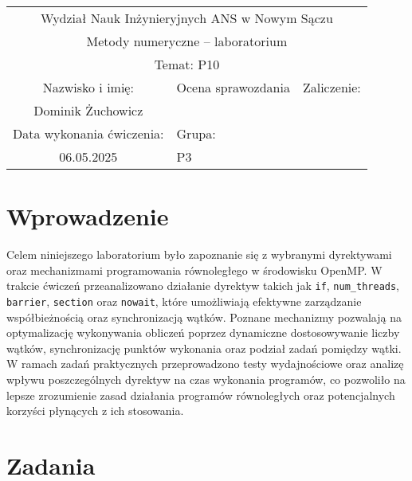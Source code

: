\documentclass{article}
\begin{document}
\sloppy
\begin{center}
    \small
        \renewcommand{\arraystretch}{1.3} %
        \setlength{\tabcolsep}{20pt} %
        \begin{tabular}{|c|c|c|}
            \hline %
            \multicolumn{3}{|c|}{\large Wydział Nauk Inżynieryjnych ANS w Nowym Sączu}   \\
            \multicolumn{3}{|c|}{\large Metody numeryczne – laboratorium}   \\
            \hline %
            \multicolumn{3}{|c|}{\large Temat: P10} \\
            \hline %
            \large Nazwisko i imię: & \large Ocena sprawozdania & \large Zaliczenie:\\
            \cline{2-3}
            \large Dominik Żuchowicz & & \\
            \hline
            \large Data wykonania ćwiczenia:&\multicolumn{2}{l|}{\large Grupa:}\\
            \large  06.05.2025 &\multicolumn{2}{l|}{\large P3}\\
            \hline
        \end{tabular}
    \end{center}

    \section*{Wprowadzenie}
    Celem niniejszego laboratorium było zapoznanie się z wybranymi dyrektywami oraz mechanizmami programowania równoległego w środowisku OpenMP. W trakcie ćwiczeń przeanalizowano działanie dyrektyw takich jak \texttt{if}, \texttt{num\_threads}, \texttt{barrier}, \texttt{section} oraz \texttt{nowait}, które umożliwiają efektywne zarządzanie współbieżnością oraz synchronizacją wątków. Poznane mechanizmy pozwalają na optymalizację wykonywania obliczeń poprzez dynamiczne dostosowywanie liczby wątków, synchronizację punktów wykonania oraz podział zadań pomiędzy wątki. W ramach zadań praktycznych przeprowadzono testy wydajnościowe oraz analizę wpływu poszczególnych dyrektyw na czas wykonania programów, co pozwoliło na lepsze zrozumienie zasad działania programów równoległych oraz potencjalnych korzyści płynących z ich stosowania.

    \section{Zadania}
\end{document}
